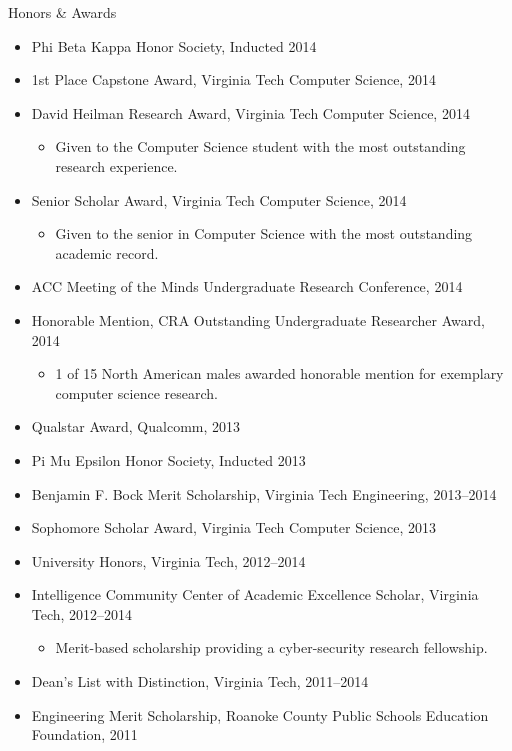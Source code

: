 \documentclass[letter]{article}
\begin{document}
\begin{minipage}{\textwidth}
{\huge Honors \& Awards }
\begin{itemize}
  \item Phi Beta Kappa Honor Society, Inducted 2014
  \item 1st Place Capstone Award, Virginia Tech Computer Science, 2014
  \item David Heilman Research Award, Virginia Tech Computer Science, 2014
  \begin{itemize}
  \item Given to the Computer Science student with the most outstanding research experience.
  \end{itemize}
  \item Senior Scholar Award, Virginia Tech Computer Science, 2014
  \begin{itemize}
  \item Given to the senior in Computer Science with the most outstanding academic record.
  \end{itemize}
  \item ACC Meeting of the Minds Undergraduate Research Conference, 2014
  \item Honorable Mention, CRA Outstanding Undergraduate Researcher Award, 2014
  \begin{itemize}
  \item 1 of 15 North American males awarded honorable mention for exemplary computer science research.
  \end{itemize}
  \item Qualstar Award, Qualcomm, 2013
  \item Pi Mu Epsilon Honor Society, Inducted 2013
  \item Benjamin F. Bock Merit Scholarship, Virginia Tech Engineering, 2013--2014
  \item Sophomore Scholar Award, Virginia Tech Computer Science, 2013
  \item University Honors, Virginia Tech, 2012--2014
  \item Intelligence Community Center of Academic Excellence Scholar, Virginia Tech, 2012--2014
  \begin{itemize}
  \item Merit-based scholarship providing a cyber-security research fellowship.
  \end{itemize}
  \item Dean's List with Distinction, Virginia Tech, 2011--2014
  \item Engineering Merit Scholarship, Roanoke County Public Schools Education Foundation, 2011

\end{itemize}
\end{minipage}
\end{document}
